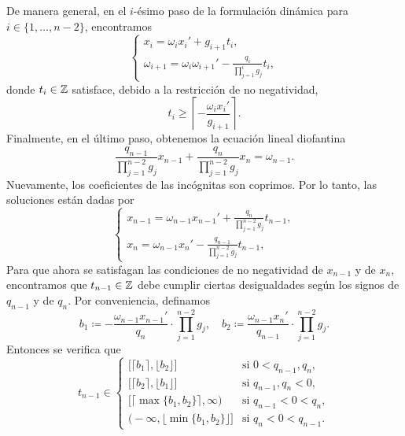 De manera general, en el $i$-ésimo paso de la formulación dinámica para $i \in \lbrace 1, \ldots, n
- 2 \rbrace$, encontramos
\begin{equation}
	\label{phase-1:eq:recursive}
	\begin{cases}
		x_i = \omega_ix_i' + g_{i + 1}t_i, \\
		\omega_{i + 1} = \omega_i\omega_{i + 1}' - \frac{q_i}{\prod_{j=1}^{i}g_j}t_i,
	\end{cases}
\end{equation}
donde $t_i \in \mathbb{Z}$ satisface, debido a la restricción de no negatividad,
\begin{equation}
	\label{phase-1:eq:param-bound}
	t_i \geq \left\lceil -\frac{\omega_ix_i'}{g_{i + 1}} \right\rceil.
\end{equation}
Finalmente, en el último paso, obtenemos la ecuación lineal diofantina
\begin{equation}
	\label{phase-1:eq:stopping}
	\frac{q_{n-1}}{\prod_{j=1}^{n-2}g_j}x_{n-1} +
	\frac{q_{n}}{\prod_{j=1}^{n-2}g_j}x_n
	= \omega_{n-1}.
\end{equation}
Nuevamente, los coeficientes de las incógnitas son coprimos. Por lo tanto, las soluciones están
dadas por
\begin{equation}
	\label{phase-1:eq:lastsol}
	\begin{cases}
		x_{n-1} = \omega_{n-1}x_{n-1}' + \frac{q_n}{\prod_{j=1}^{n-2}g_j}t_{n-1}, \\
		x_n = \omega_{n-1}x_n' - \frac{q_{n-1}}{\prod_{j=1}^{n-2}g_j}t_{n-1},
	\end{cases}
\end{equation}
Para que ahora se satisfagan las condiciones de no negatividad de $x_{n-1}$ y de $x_n$, encontramos
que $t_{n-1} \in \mathbb{Z}$ debe cumplir ciertas desigualdades según los signos de $q_{n-1}$ y de $q_n$.
Por conveniencia, definamos
\begin{equation*}
	b_1 \coloneq -\frac{\omega_{n-1}x_{n-1}'}{q_n} \cdot \prod_{j=1}^{n-2}g_j,
	\quad b_2 \coloneq \frac{\omega_{n-1}x_{n}'}{q_{n-1}} \cdot \prod_{j=1}^{n-2}g_j.
\end{equation*}
Entonces se verifica que
\begin{equation}
	\label{phase-1:eq:feasible-param}
	t_{n-1} \in 
	\begin{cases}
		\big[ \lceil b_1 \rceil, \lfloor b_2 \rfloor \big] & \text{si } 0 < q_{n-1}, q_n, \\
		\big[ \lceil b_2 \rceil, \lfloor b_1 \rfloor \big] & \text{si } q_{n-1}, q_n < 0, \\
		\big[ \lceil \max\lbrace b_1 ,  b_2 \rbrace \rceil, \infty \big) & \text{si } q_{n-1} < 0 < q_n, \\
		\big( -\infty, \lfloor \min\lbrace b_1, b_2\rbrace \rfloor \big] & \text{si } q_n < 0 < q_{n-1}.
	\end{cases}
\end{equation}

